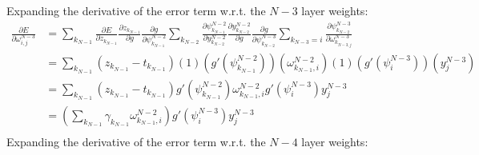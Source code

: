 \documentclass{article}
\begin{document}
%
Expanding the derivative of the error term w.r.t. the $N-3$ layer weights:
%
\begin{equation} \label{eq:derive_du_nm3}
\begin{aligned}
\frac{\partial E}{\partial \omega_{i,j}^{N-3}} &= 
%
\sum_{k_{N-1}}
\frac{\partial E}{\partial z_{k_{N-1}}}
\frac{\partial z_{k_{N-1}}}{\partial g}
\frac{\partial g}{\partial \psi_{k_{N-1}}^{N-2}}
%
\sum_{k_{N-2}}
\frac{\partial \psi_{k_{N-1}}^{N-2}}{\partial y_{k_{N-2}}^{N-2}}
\frac{\partial y_{k_{N-2}}^{N-2}}{\partial g}
\frac{\partial g}{\partial \psi_{k_{N-2}}^{N-3}}
%
\sum_{k_{N-3}=i}
\frac{\partial \psi_{k_{N-2}}^{N-3}}{\partial \omega_{k_{N-3,j}}^{N-3}} \\
& = \sum_{k_{N-1}}
\left( z_{k_{N-1}} - t_{k_{N-1}} \right)
%
(1)
\left( g' \left( \psi_{k_{N-1}}^{N-2} \right) \right)
%
\left( \omega_{k_{N-1},i}^{N-2} \right)
(1)
\left( g' (\psi_i^{N-3}) \right)
\left( y_j^{N-3} \right) \\
& =
\sum_{k_{N-1}}
\left( z_{k_{N-1}} - t_{k_{N-1}} \right)
%
g' \left(\psi_{k_{N-1}}^{N-2}\right)
%
\omega_{k_{N-1},i}^{N-2}
g' \left( \psi_i^{N-3} \right)
y_j^{N-3} \\
& =
\left(
\sum_{k_{N-1}}
\gamma_{k_{N-1}}
\omega_{k_{N-1},i}^{N-2}
\right)
g' \left( \psi_i^{N-3} \right)
y_j^{N-3} \\
\end{aligned}
\end{equation}
%
Expanding the derivative of the error term w.r.t. the $N-4$ layer weights:
%
\end{document}
